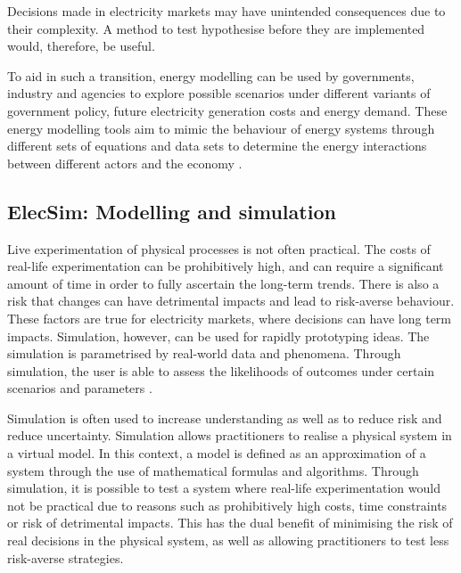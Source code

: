 Decisions made in electricity markets may have unintended consequences due to their complexity. A method to test hypothesise before they are implemented would, therefore, be useful.

To aid in such a transition, energy modelling can be used by governments, industry and agencies to explore possible scenarios under different variants of government policy, future electricity generation costs and energy demand. These energy modelling tools aim to mimic the behaviour of energy systems through different sets of equations and data sets to determine the energy interactions between different actors and the economy \cite{Machado2019}.





\subsection{ElecSim: Modelling and simulation}




Live experimentation of physical processes is not often practical. The costs of real-life experimentation can be prohibitively high, and can require a significant amount of time in order to fully ascertain the long-term trends. There is also a risk that changes can have detrimental impacts and lead to risk-averse behaviour. These factors are true for electricity markets, where decisions can have long term impacts. Simulation, however, can be used for rapidly prototyping ideas. The simulation is parametrised by real-world data and phenomena. Through simulation, the user is able to assess the likelihoods of outcomes under certain scenarios and parameters \cite{Law:603360}.





Simulation is often used to increase understanding as well as to reduce risk and reduce uncertainty. Simulation allows practitioners to realise a physical system in a virtual model. In this context, a model is defined as an approximation of a system through the use of mathematical formulas and algorithms. Through simulation, it is possible to test a system where real-life experimentation would not be practical due to reasons such as prohibitively high costs, time constraints or risk of detrimental impacts. This has the dual benefit of minimising the risk of real decisions in the physical system, as well as allowing practitioners to test less risk-averse strategies.

